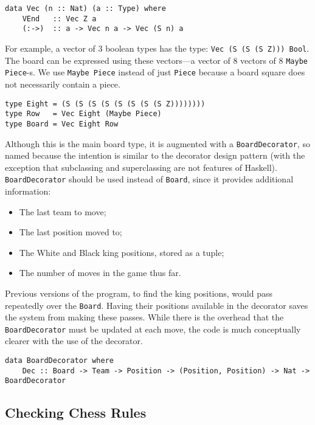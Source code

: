 \documentclass[12pt, a4paper, bibliography=totocnumbered]{scrartcl}
\begin{document}
\begin{lstlisting}
data Vec (n :: Nat) (a :: Type) where
    VEnd   :: Vec Z a
    (:->)  :: a -> Vec n a -> Vec (S n) a
\end{lstlisting}

For example, a vector of 3 boolean types has the type: \lstinline{Vec (S (S (S Z))) Bool}. The board can be expressed using these vectors---a vector of 8 vectors of 8 \lstinline{Maybe Piece}-s. We use \lstinline{Maybe Piece} instead of just \lstinline{Piece} because a board square does not necessarily contain a piece.

\begin{lstlisting}
type Eight = (S (S (S (S (S (S (S (S Z))))))))
type Row   = Vec Eight (Maybe Piece)
type Board = Vec Eight Row
\end{lstlisting}

Although this is the main board type, it is augmented with a \lstinline{BoardDecorator}, so named because the intention is similar to the decorator design pattern \cite{decorator} (with the exception that subclassing and superclassing are not features of Haskell). \lstinline{BoardDecorator} should be used instead of \lstinline{Board}, since it provides additional information:

\begin{itemize}
    \item The last team to move;
    \item The last position moved to;
    \item The White and Black king positions, stored as a tuple;
    \item The number of moves in the game thus far.
\end{itemize}

Previous versions of the program, to find the king positions, would pass repeatedly over the \lstinline{Board}. Having their positions available in the decorator saves the system from making these passes. While there is the overhead that the \lstinline{BoardDecorator} must be updated at each move, the code is much conceptually clearer with the use of the decorator.

\begin{lstlisting}
data BoardDecorator where
    Dec :: Board -> Team -> Position -> (Position, Position) -> Nat -> BoardDecorator
\end{lstlisting}

\subsection{Checking Chess Rules}
\end{document}
